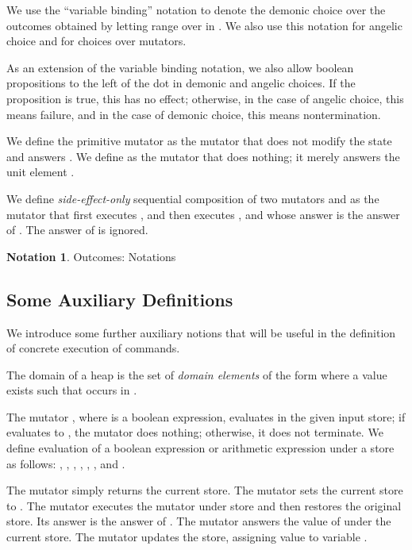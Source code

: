 \documentclass{CSML}
\theoremstyle{definition}\newtheorem{notation}[thm]{Notation}
\theoremstyle{plain}\newtheorem{satz}[thm]{Satz}
\begin{document}
We use the ``variable binding'' notation  to denote the demonic
choice over the outcomes obtained by letting  range over  in . We also use this
notation for angelic choice and for choices over mutators.

As an extension of the variable binding notation, we also allow boolean 
propositions to the left of the dot in demonic and angelic 
choices. If the proposition is true, this has no effect; 
otherwise, in the case of angelic choice, this means failure, 
and in the case of demonic choice, this means nontermination. 

We define the primitive mutator  as the mutator that does not modify the state
and answers . We define  as the mutator that does nothing; it merely answers the unit
element .

We define \emph{side-effect-only} sequential composition  of two mutators  and  as the mutator
that first executes , and then executes , and whose answer is the answer of . The answer of  is ignored.

\begin{notation}{Outcomes: Notations}











\end{notation}

\subsection{Some Auxiliary Definitions}

We introduce some further auxiliary notions that will be useful in the definition of concrete execution of commands.

The domain of a heap  is the set of \emph{domain elements} of the form 
 where a value  exists such that  
occurs in .

The mutator , \label{def:assume} where  
is a boolean expression, evaluates  in the given input 
store; if  evaluates to , the mutator does 
nothing; otherwise, it does not terminate.
We define evaluation 
of a boolean expression  or arithmetic expression  under a store  as follows:
,
,
,
,
,
,
and
.

The mutator  simply returns the current store.
The mutator  sets the current store to .
The mutator  executes the mutator  under store  and
then restores the original store. Its answer is the answer of .
The mutator  answers the value of  under the current store.
The mutator  updates the store, assigning value  to variable .
\end{document}

